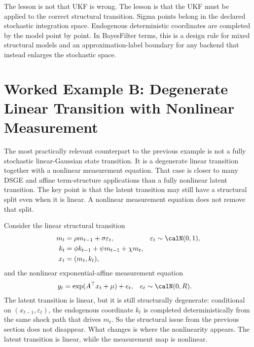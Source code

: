The lesson is not that UKF is wrong.  The lesson is that the UKF must be
applied to the correct structural transition.  Sigma points belong in the
declared stochastic integration space.  Endogenous deterministic coordinates
are completed by the model point by point.  In BayesFilter terms, this is a
design rule for mixed structural models and an approximation-label boundary for
any backend that instead enlarges the stochastic space.

\section[Degenerate Linear Transition Example]{Worked Example B: Degenerate Linear Transition with Nonlinear Measurement}
\label{sec:bf-structural-nonlinear-measurement}

The most practically relevant counterpart to the previous example is not a fully
stochastic linear-Gaussian state transition.  It is a degenerate linear
transition together with a nonlinear measurement equation.  That case is closer
to many DSGE and affine term-structure applications than a fully nonlinear
latent transition.  The key point is that the latent transition may still have a
structural split even when it is linear.  A nonlinear measurement equation does
not remove that split.

Consider the linear structural transition
\begin{align}
  m_t &= \rho m_{t-1} + \sigma\varepsilon_t,
    & \varepsilon_t &\sim \calN(0,1),
    \label{eq:bf-exp-affine-transition-m}\\
  k_t &= \phi k_{t-1} + \psi m_{t-1} + \chi m_t,
    \label{eq:bf-exp-affine-transition-k}\\
  x_t &= (m_t,k_t),
    \label{eq:bf-exp-affine-transition-state}
\end{align}
and the nonlinear exponential-affine measurement equation
\begin{align}
  y_t &= \exp(A^\top x_t + \mu) + e_t,
    & e_t &\sim \calN(0,R).
    \label{eq:bf-exp-affine-observation}
\end{align}
The latent transition is linear, but it is still structurally degenerate:
conditional on $(x_{t-1},\varepsilon_t)$, the endogenous coordinate $k_t$ is
completed deterministically from the same shock path that drives $m_t$.  So the
structural issue from the previous section does not disappear.  What changes is
where the nonlinearity appears.  The latent transition is linear, while the
measurement map is nonlinear.


